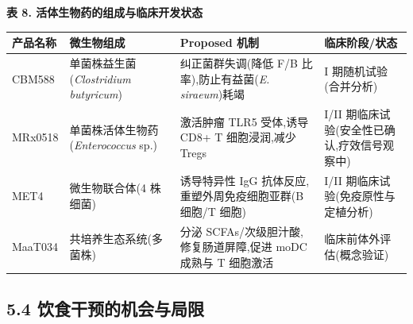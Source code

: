 \documentclass[11pt]{article}
\newcounter{none}
\begin{document}
\textbf{表 8. 活体生物药的组成与临床开发状态}

{\def\LTcaptype{none} %
\begin{longtable}[]{@{}
  >{\raggedright\arraybackslash}p{}
  >{\raggedright\arraybackslash}p{}
  >{\raggedright\arraybackslash}p{}
  >{\raggedright\arraybackslash}p{}@{}}
\toprule\noalign{}
\begin{minipage}[b]{\linewidth}\raggedright
产品名称
\end{minipage} & \begin{minipage}[b]{\linewidth}\raggedright
微生物组成
\end{minipage} & \begin{minipage}[b]{\linewidth}\raggedright
Proposed 机制
\end{minipage} & \begin{minipage}[b]{\linewidth}\raggedright
临床阶段/状态
\end{minipage} \\
\midrule\noalign{}
\endhead
\bottomrule\noalign{}
\endlastfoot
CBM588 & 单菌株益生菌 (\emph{Clostridium butyricum}) & 纠正菌群失调(降低 F/B 比率),防止有益菌(\emph{E. siraeum})耗竭 & I 期随机试验(合并分析) \\
MRx0518 & 单菌株活体生物药 (\emph{Enterococcus} sp.) & 激活肿瘤 TLR5 受体,诱导 CD8+ T 细胞浸润,减少 Tregs & I/II 期临床试验(安全性已确认,疗效信号观察中) \\
MET4 & 微生物联合体(4 株细菌) & 诱导特异性 IgG 抗体反应,重塑外周免疫细胞亚群(B 细胞/T 细胞) & I/II 期临床试验(免疫原性与定植分析) \\
MaaT034 & 共培养生态系统(多菌株) & 分泌 SCFAs/次级胆汁酸,修复肠道屏障,促进 moDC 成熟与 T 细胞激活 & 临床前体外评估(概念验证) \\
\end{longtable}
}

\subsection{5.4 饮食干预的机会与局限}\label{ux996eux98dfux5e72ux9884ux7684ux673aux4f1aux4e0eux5c40ux9650}
\end{document}
